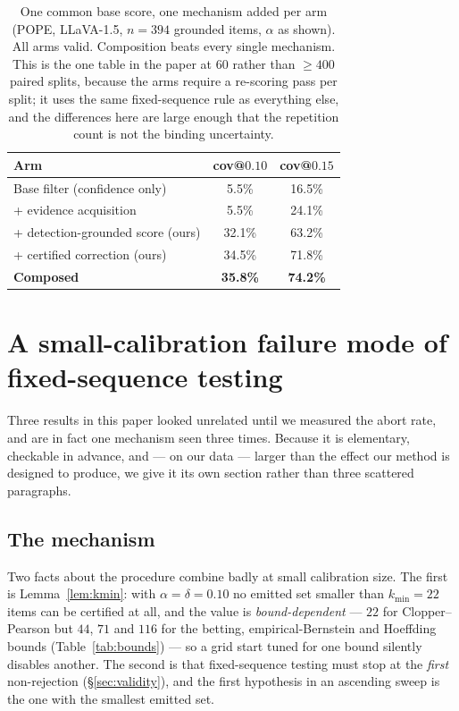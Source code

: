 \documentclass{article}
\theoremstyle{plain}
\theoremstyle{definition}
\theoremstyle{remark}
\begin{document}
\begin{table}[t]
\centering
\caption{One common base score, one mechanism added per arm (POPE, LLaVA-1.5, $n=394$
grounded items, $\alpha$ as shown). All arms valid. Composition beats every single mechanism.
This is the one table in the paper at $60$ rather than $\ge400$ paired splits, because the arms
require a re-scoring pass per split; it uses the same fixed-sequence rule as everything else, and
the differences here are large enough that the repetition count is not the binding uncertainty.}
\label{tab:bcea}
\begin{tabular}{lcc}
\toprule
Arm & cov@$0.10$ & cov@$0.15$\\
\midrule
Base filter (confidence only)              & 5.5\%  & 16.5\%\\
\quad + evidence acquisition \citep{bcea}  & 5.5\%  & 24.1\%\\
\quad + detection-grounded score (ours)    & 32.1\% & 63.2\%\\
\quad + certified correction (ours)        & 34.5\% & 71.8\%\\
\textbf{Composed}                          & \textbf{35.8\%} & \textbf{74.2\%}\\
\bottomrule
\end{tabular}
\end{table}

\section{A small-calibration failure mode of fixed-sequence testing}
\label{sec:kminfail}

Three results in this paper looked unrelated until we measured the abort rate, and are in fact
one mechanism seen three times. Because it is elementary, checkable in advance, and --- on our
data --- larger than the effect our method is designed to produce, we give it its own section
rather than three scattered paragraphs.

\subsection{The mechanism}

Two facts about the procedure combine badly at small calibration size. The first is
Lemma~\ref{lem:kmin}: with $\alpha=\delta=0.10$ no emitted set smaller than $k_{\min}=22$ items
can be certified at all, and the value is \emph{bound-dependent} --- $22$ for Clopper--Pearson but
$44$, $71$ and $116$ for the betting, empirical-Bernstein and Hoeffding bounds
(Table~\ref{tab:bounds}) --- so a grid start tuned for one bound silently disables another. The
second is that fixed-sequence testing must stop at the \emph{first} non-rejection
(\S\ref{sec:validity}), and the first hypothesis in an ascending sweep is the one with the
smallest emitted set.
\end{document}
